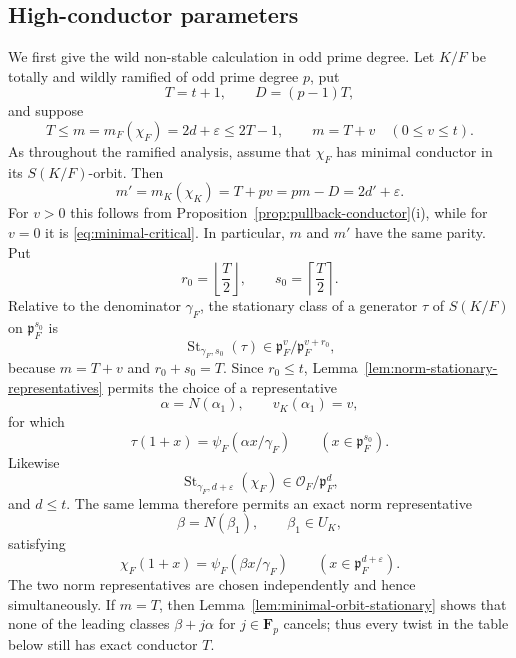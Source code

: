 \documentclass[11pt]{amsart}
\theoremstyle{definition}
\theoremstyle{remark}
\newcommand{\F}{\mathbf F}
\newcommand{\cO}{\mathcal O}
\newcommand{\p}{\mathfrak p}
\begin{document}
\subsection{High-conductor parameters}

We first give the wild non-stable calculation in odd prime degree.
Let $K/F$ be totally and wildly ramified of odd prime degree $p$, put
\[
 T=t+1,\qquad D=(p-1)T,
\]
and suppose
\[
 T\le m=m_F(\chi_F)=2d+\varepsilon\le2T-1,
 \qquad m=T+v\quad(0\le v\le t).
\]
As throughout the ramified analysis, assume that $\chi_F$ has minimal
conductor in its $S(K/F)$-orbit.  Then
\begin{equation}\label{eq:mprime-high}
 m'=m_K(\chi_K)=T+pv=pm-D=2d'+\varepsilon.
\end{equation}
For $v>0$ this follows from
Proposition~\ref{prop:pullback-conductor}(i), while for $v=0$ it is
\eqref{eq:minimal-critical}.  In particular, $m$ and $m'$ have the same
parity.  Put
\[
 r_0=\left\lfloor\frac T2\right\rfloor,
 \qquad s_0=\left\lceil\frac T2\right\rceil.
\]
Relative to the denominator $\gamma_F$, the stationary class of a
generator $\tau$ of $S(K/F)$ on $\p_F^{s_0}$ is
\begin{equation}\label{eq:tau-high-stationary-class}
 \operatorname{St}_{\gamma_F,s_0}(\tau)
 \in\p_F^v/\p_F^{v+r_0},
\end{equation}
because $m=T+v$ and $r_0+s_0=T$.  Since $r_0\le t$,
Lemma~\ref{lem:norm-stationary-representatives} permits the choice of a
representative
\begin{equation}\label{eq:alpha-high}
 \alpha=N(\alpha_1),\qquad v_K(\alpha_1)=v,
\end{equation}
for which
\begin{equation}\label{eq:tau-high-linearization}
 \tau(1+x)=\psi_F(\alpha x/\gamma_F)
 \qquad(x\in\p_F^{s_0}).
\end{equation}
Likewise
\[
 \operatorname{St}_{\gamma_F,d+\varepsilon}(\chi_F)
 \in\cO_F/\p_F^d,
\]
and $d\le t$.  The same lemma therefore permits an exact norm
representative
\begin{equation}\label{eq:beta-high-norm}
 \beta=N(\beta_1),\qquad \beta_1\in U_K,
\end{equation}
satisfying
\begin{equation}\label{eq:chi-high-linearization}
 \chi_F(1+x)=\psi_F(\beta x/\gamma_F)
 \qquad(x\in\p_F^{d+\varepsilon}).
\end{equation}
The two norm representatives are chosen independently and hence
simultaneously.  If $m=T$, then
Lemma~\ref{lem:minimal-orbit-stationary} shows that none of the leading
classes $\beta+j\alpha$ for $j\in\F_p$ cancels; thus every twist in the
table below still has exact conductor $T$.
\end{document}
